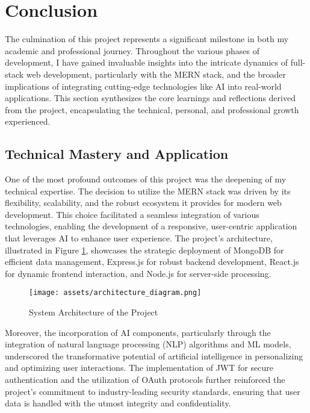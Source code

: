 \section{Conclusion}
The culmination of this project represents a significant milestone in both my academic and professional journey. Throughout the various phases of development, I have gained invaluable insights into the intricate dynamics of full-stack web development, particularly with the \gls{MERN} stack, and the broader implications of integrating cutting-edge technologies like \gls{AI} into real-world applications. This section synthesizes the core learnings and reflections derived from the project, encapsulating the technical, personal, and professional growth experienced.

\subsection{Technical Mastery and Application}
One of the most profound outcomes of this project was the deepening of my technical expertise. The decision to utilize the \gls{MERN} stack was driven by its flexibility, scalability, and the robust ecosystem it provides for modern web development. This choice facilitated a seamless integration of various technologies, enabling the development of a responsive, user-centric application that leverages \gls{AI} to enhance user experience. The project's architecture, illustrated in Figure \ref{fig:architecture_diagram}, showcases the strategic deployment of MongoDB for efficient data management, Express.js for robust backend development, React.js for dynamic frontend interaction, and Node.js for server-side processing. 

\begin{figure}[h]
    \centering
    \texttt{[image: assets/architecture\_diagram.png]}
    \caption{System Architecture of the Project}
    \label{fig:architecture_diagram}
\end{figure}

Moreover, the incorporation of \gls{AI} components, particularly through the integration of natural language processing (NLP) algorithms and \gls{ML} models, underscored the transformative potential of artificial intelligence in personalizing and optimizing user interactions. The implementation of \gls{JWT} for secure authentication and the utilization of \gls{OAuth} protocols further reinforced the project's commitment to industry-leading security standards, ensuring that user data is handled with the utmost integrity and confidentiality.

